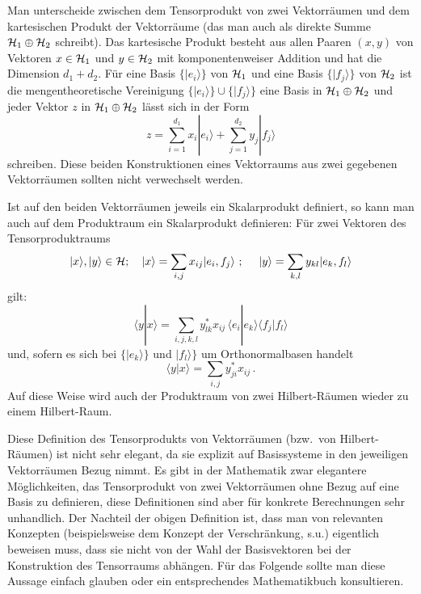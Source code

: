 Man unterscheide zwischen dem
Tensorprodukt von zwei Vektorr\"aumen und dem kartesischen
Produkt der Vektorr\"aume (das man auch als direkte Summe
${\cal H}_1 \oplus{\cal H}_2$ schreibt). Das kartesische Produkt
besteht aus allen Paaren $(x,y)$ von Vektoren $x\in {\cal H}_1$ 
und $y\in {\cal H}_2$ mit komponentenweiser
Addition und hat die Dimension $d_1+d_2$. F\"ur eine Basis $\{|e_i\rangle\}$ von
${\cal H}_1$ und eine Basis $\{|f_j\rangle\}$ von ${\cal H}_2$ ist die 
mengentheoretische Vereinigung $\{|e_i \rangle\}\cup \{|f_j\rangle\}$ eine Basis
in ${\cal H}_1\oplus {\cal H}_2$ und jeder Vektor $z$ in ${\cal H}_1\oplus {\cal H}_2$
l\"asst sich in der Form
\begin{equation}
       z = \sum_{i=1}^{d_1} x_i |e_i\rangle + \sum_{j=1}^{d_2} y_j |f_j\rangle
\end{equation}
schreiben. Diese beiden Konstruktionen eines Vektorraums aus zwei
gegebenen Vektorr\"aumen sollten nicht verwechselt werden.

Ist auf den beiden Vektorr\"aumen jeweils ein Skalarprodukt definiert, so kann man
auch auf dem Produktraum ein Skalarprodukt definieren:
F\"ur zwei Vektoren des Tensorproduktraums
\begin{equation}
|x\rangle, |y\rangle \in {\cal H} ;~~~
|x\rangle = \sum_{i,j} x_{ij}|e_i,f_j\rangle ~;~~~~  
|y\rangle = \sum_{k,l} y_{kl}|e_k,f_l\rangle  
\end{equation}
gilt:
\begin{equation}
  \langle y | x \rangle = \sum_{i,j,k,l} 
         y^*_{lk} x_{ij} \,  \langle e_i|e_k\rangle \langle f_j|f_l\rangle
\end{equation}
und, sofern es sich bei $\{ | e_k\rangle \}$ und $|f_l\rangle \}$ um Orthonormalbasen handelt
\begin{equation}
  \langle y | x \rangle = \sum_{i,j} 
         y^*_{ji} x_{ij}   \, . 
\end{equation}
Auf diese Weise wird auch der Produktraum von zwei Hilbert-R\"aumen wieder zu
einem Hilbert-Raum. 

Diese Definition des Tensorprodukts von Vektorr\"aumen
(bzw.\ von Hilbert-R\"aumen) ist nicht sehr elegant, da sie explizit auf Basissysteme
in den jeweiligen Vektorr\"aumen Bezug nimmt. Es gibt in der
Mathematik zwar elegantere M\"oglichkeiten, das Tensorprodukt von
zwei Vektorr\"aumen ohne Bezug auf eine Basis zu definieren, diese
Definitionen sind aber f\"ur konkrete Berechnungen sehr unhandlich.
Der Nachteil der obigen Definition ist, dass man von
relevanten Konzepten (beispielsweise dem Konzept der
Verschr\"ankung, s.u.) eigentlich beweisen muss, dass sie  nicht von der
Wahl der Basisvektoren bei der Konstruktion des Tensorraums abh\"angen. 
F\"ur das Folgende sollte man diese Aussage einfach glauben oder 
ein entsprechendes Mathematikbuch konsultieren.

